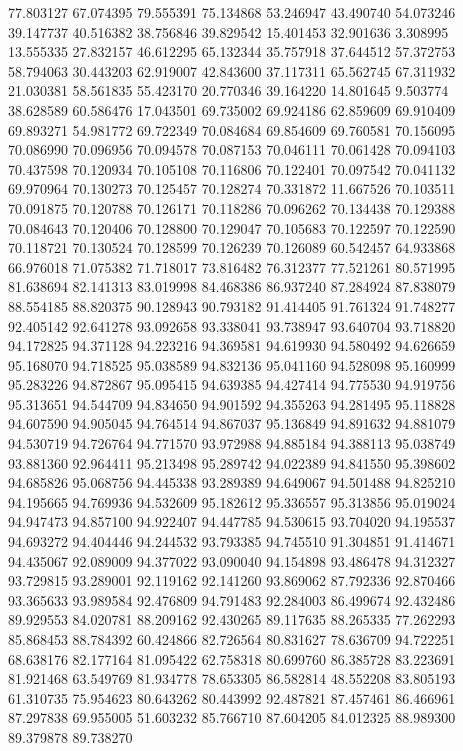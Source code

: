 77.803127
67.074395
79.555391
75.134868
53.246947
43.490740
54.073246
39.147737
40.516382
38.756846
39.829542
15.401453
32.901636
3.308995
13.555335
27.832157
46.612295
65.132344
35.757918
37.644512
57.372753
58.794063
30.443203
62.919007
42.843600
37.117311
65.562745
67.311932
21.030381
58.561835
55.423170
20.770346
39.164220
14.801645
9.503774
38.628589
60.586476
17.043501
69.735002
69.924186
62.859609
69.910409
69.893271
54.981772
69.722349
70.084684
69.854609
69.760581
70.156095
70.086990
70.096956
70.094578
70.087153
70.046111
70.061428
70.094103
70.437598
70.120934
70.105108
70.116806
70.122401
70.097542
70.041132
69.970964
70.130273
70.125457
70.128274
70.331872
11.667526
70.103511
70.091875
70.120788
70.126171
70.118286
70.096262
70.134438
70.129388
70.084643
70.120406
70.128800
70.129047
70.105683
70.122597
70.122590
70.118721
70.130524
70.128599
70.126239
70.126089
60.542457
64.933868
66.976018
71.075382
71.718017
73.816482
76.312377
77.521261
80.571995
81.638694
82.141313
83.019998
84.468386
86.937240
87.284924
87.838079
88.554185
88.820375
90.128943
90.793182
91.414405
91.761324
91.748277
92.405142
92.641278
93.092658
93.338041
93.738947
93.640704
93.718820
94.172825
94.371128
94.223216
94.369581
94.619930
94.580492
94.626659
95.168070
94.718525
95.038589
94.832136
95.041160
94.528098
95.160999
95.283226
94.872867
95.095415
94.639385
94.427414
94.775530
94.919756
95.313651
94.544709
94.834650
94.901592
94.355263
94.281495
95.118828
94.607590
94.905045
94.764514
94.867037
95.136849
94.891632
94.881079
94.530719
94.726764
94.771570
93.972988
94.885184
94.388113
95.038749
93.881360
92.964411
95.213498
95.289742
94.022389
94.841550
95.398602
94.685826
95.068756
94.445338
93.289389
94.649067
94.501488
94.825210
94.195665
94.769936
94.532609
95.182612
95.336557
95.313856
95.019024
94.947473
94.857100
94.922407
94.447785
94.530615
93.704020
94.195537
94.693272
94.404446
94.244532
93.793385
94.745510
91.304851
91.414671
94.435067
92.089009
94.377022
93.090040
94.154898
93.486478
94.312327
93.729815
93.289001
92.119162
92.141260
93.869062
87.792336
92.870466
93.365633
93.989584
92.476809
94.791483
92.284003
86.499674
92.432486
89.929553
84.020781
88.209162
92.430265
89.117635
88.265335
77.262293
85.868453
88.784392
60.424866
82.726564
80.831627
78.636709
94.722251
68.638176
82.177164
81.095422
62.758318
80.699760
86.385728
83.223691
81.921468
63.549769
81.934778
78.653305
86.582814
48.552208
83.805193
61.310735
75.954623
80.643262
80.443992
92.487821
87.457461
86.466961
87.297838
69.955005
51.603232
85.766710
87.604205
84.012325
88.989300
89.379878
89.738270
